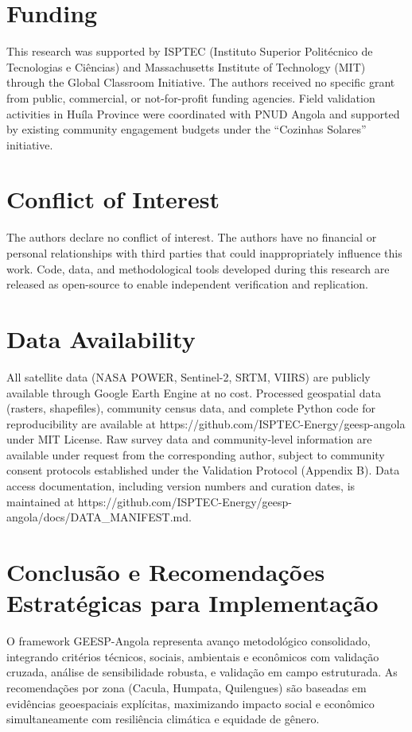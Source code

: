 \documentclass[12pt, a4paper]{article}
\begin{document}
\section*{Funding}
This research was supported by ISPTEC (Instituto Superior Politécnico de Tecnologias e Ciências) and Massachusetts Institute of Technology (MIT) through the Global Classroom Initiative. The authors received no specific grant from public, commercial, or not-for-profit funding agencies. Field validation activities in Huíla Province were coordinated with PNUD Angola and supported by existing community engagement budgets under the ``Cozinhas Solares'' initiative.

\section*{Conflict of Interest}
The authors declare no conflict of interest. The authors have no financial or personal relationships with third parties that could inappropriately influence this work. Code, data, and methodological tools developed during this research are released as open-source to enable independent verification and replication.

\section*{Data Availability}
All satellite data (NASA POWER, Sentinel-2, SRTM, VIIRS) are publicly available through Google Earth Engine at no cost. Processed geospatial data (rasters, shapefiles), community census data, and complete Python code for reproducibility are available at https://github.com/ISPTEC-Energy/geesp-angola under MIT License. Raw survey data and community-level information are available under request from the corresponding author, subject to community consent protocols established under the Validation Protocol (Appendix B). Data access documentation, including version numbers and curation dates, is maintained at https://github.com/ISPTEC-Energy/geesp-angola/docs/DATA\_MANIFEST.md.

\section{Conclusão e Recomendações Estratégicas para Implementação}

O framework GEESP-Angola representa avanço metodológico consolidado, integrando critérios técnicos, sociais, ambientais e econômicos com validação cruzada, análise de sensibilidade robusta, e validação em campo estruturada. As recomendações por zona (Cacula, Humpata, Quilengues) são baseadas em evidências geoespaciais explícitas, maximizando impacto social e econômico simultaneamente com resiliência climática e equidade de gênero.
\end{document}
